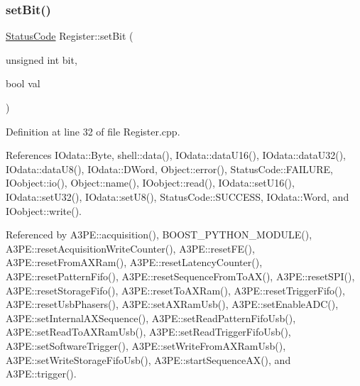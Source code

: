 \subsubsection{\texorpdfstring{set\+Bit()}{setBit()}}
{\footnotesize\ttfamily \hyperlink{classStatusCode}{Status\+Code} Register\+::set\+Bit (\begin{DoxyParamCaption}\item[{unsigned int}]{bit,  }\item[{bool}]{val }\end{DoxyParamCaption})}



Definition at line 32 of file Register.\+cpp.



References I\+Odata\+::\+Byte, shell\+::data(), I\+Odata\+::data\+U16(), I\+Odata\+::data\+U32(), I\+Odata\+::data\+U8(), I\+Odata\+::\+D\+Word, Object\+::error(), Status\+Code\+::\+F\+A\+I\+L\+U\+RE, I\+Oobject\+::io(), Object\+::name(), I\+Oobject\+::read(), I\+Odata\+::set\+U16(), I\+Odata\+::set\+U32(), I\+Odata\+::set\+U8(), Status\+Code\+::\+S\+U\+C\+C\+E\+SS, I\+Odata\+::\+Word, and I\+Oobject\+::write().



Referenced by A3\+P\+E\+::acquisition(), B\+O\+O\+S\+T\+\_\+\+P\+Y\+T\+H\+O\+N\+\_\+\+M\+O\+D\+U\+L\+E(), A3\+P\+E\+::reset\+Acquisition\+Write\+Counter(), A3\+P\+E\+::reset\+F\+E(), A3\+P\+E\+::reset\+From\+A\+X\+Ram(), A3\+P\+E\+::reset\+Latency\+Counter(), A3\+P\+E\+::reset\+Pattern\+Fifo(), A3\+P\+E\+::reset\+Sequence\+From\+To\+A\+X(), A3\+P\+E\+::reset\+S\+P\+I(), A3\+P\+E\+::reset\+Storage\+Fifo(), A3\+P\+E\+::reset\+To\+A\+X\+Ram(), A3\+P\+E\+::reset\+Trigger\+Fifo(), A3\+P\+E\+::reset\+Usb\+Phasers(), A3\+P\+E\+::set\+A\+X\+Ram\+Usb(), A3\+P\+E\+::set\+Enable\+A\+D\+C(), A3\+P\+E\+::set\+Internal\+A\+X\+Sequence(), A3\+P\+E\+::set\+Read\+Pattern\+Fifo\+Usb(), A3\+P\+E\+::set\+Read\+To\+A\+X\+Ram\+Usb(), A3\+P\+E\+::set\+Read\+Trigger\+Fifo\+Usb(), A3\+P\+E\+::set\+Software\+Trigger(), A3\+P\+E\+::set\+Write\+From\+A\+X\+Ram\+Usb(), A3\+P\+E\+::set\+Write\+Storage\+Fifo\+Usb(), A3\+P\+E\+::start\+Sequence\+A\+X(), and A3\+P\+E\+::trigger().


